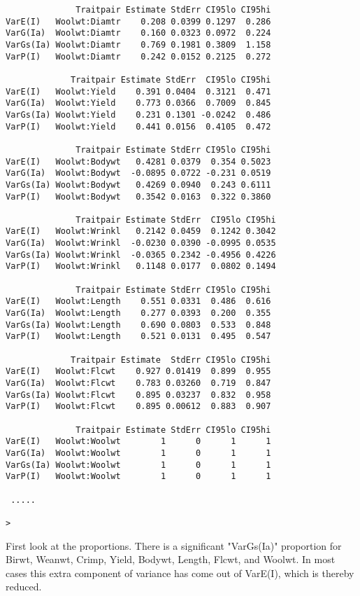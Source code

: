 \documentclass[titlepage]{article}  %
\begin{document}
\begin{verbatim}
              Traitpair Estimate StdErr CI95lo CI95hi
VarE(I)   Woolwt:Diamtr    0.208 0.0399 0.1297  0.286
VarG(Ia)  Woolwt:Diamtr    0.160 0.0323 0.0972  0.224
VarGs(Ia) Woolwt:Diamtr    0.769 0.1981 0.3809  1.158
VarP(I)   Woolwt:Diamtr    0.242 0.0152 0.2125  0.272

             Traitpair Estimate StdErr  CI95lo CI95hi
VarE(I)   Woolwt:Yield    0.391 0.0404  0.3121  0.471
VarG(Ia)  Woolwt:Yield    0.773 0.0366  0.7009  0.845
VarGs(Ia) Woolwt:Yield    0.231 0.1301 -0.0242  0.486
VarP(I)   Woolwt:Yield    0.441 0.0156  0.4105  0.472

              Traitpair Estimate StdErr CI95lo CI95hi
VarE(I)   Woolwt:Bodywt   0.4281 0.0379  0.354 0.5023
VarG(Ia)  Woolwt:Bodywt  -0.0895 0.0722 -0.231 0.0519
VarGs(Ia) Woolwt:Bodywt   0.4269 0.0940  0.243 0.6111
VarP(I)   Woolwt:Bodywt   0.3542 0.0163  0.322 0.3860

              Traitpair Estimate StdErr  CI95lo CI95hi
VarE(I)   Woolwt:Wrinkl   0.2142 0.0459  0.1242 0.3042
VarG(Ia)  Woolwt:Wrinkl  -0.0230 0.0390 -0.0995 0.0535
VarGs(Ia) Woolwt:Wrinkl  -0.0365 0.2342 -0.4956 0.4226
VarP(I)   Woolwt:Wrinkl   0.1148 0.0177  0.0802 0.1494

              Traitpair Estimate StdErr CI95lo CI95hi
VarE(I)   Woolwt:Length    0.551 0.0331  0.486  0.616
VarG(Ia)  Woolwt:Length    0.277 0.0393  0.200  0.355
VarGs(Ia) Woolwt:Length    0.690 0.0803  0.533  0.848
VarP(I)   Woolwt:Length    0.521 0.0131  0.495  0.547

             Traitpair Estimate  StdErr CI95lo CI95hi
VarE(I)   Woolwt:Flcwt    0.927 0.01419  0.899  0.955
VarG(Ia)  Woolwt:Flcwt    0.783 0.03260  0.719  0.847
VarGs(Ia) Woolwt:Flcwt    0.895 0.03237  0.832  0.958
VarP(I)   Woolwt:Flcwt    0.895 0.00612  0.883  0.907

              Traitpair Estimate StdErr CI95lo CI95hi
VarE(I)   Woolwt:Woolwt        1      0      1      1
VarG(Ia)  Woolwt:Woolwt        1      0      1      1
VarGs(Ia) Woolwt:Woolwt        1      0      1      1
VarP(I)   Woolwt:Woolwt        1      0      1      1

 .....

>
\end{verbatim}

First look at the proportions. There is a significant "VarGs(Ia)" proportion for Birwt, Weanwt, Crimp, Yield, Bodywt, Length, Flcwt, and Woolwt. In most cases this extra component of variance has come out of VarE(I), which is thereby reduced.
\end{document}
